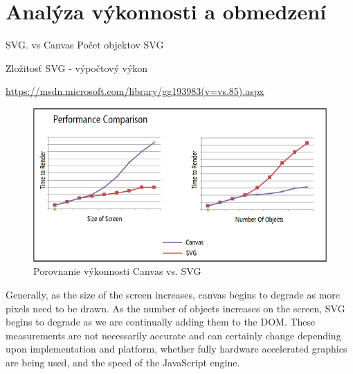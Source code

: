 \chapter{Analýza výkonnosti a obmedzení }

SVG. vs Canvas 
Počet objektov SVG 

Zložitosť SVG - výpočtový výkon

\url{https://msdn.microsoft.com/library/gg193983(v=vs.85).aspx}

 \begin{figure}[H]
\centering
\includegraphics[width=0.7\linewidth]{obrazky/porovnanie}
\caption{Porovnanie výkonnosti Canvas vs. SVG}
\label{fig:podpora}
\end{figure}

Generally, as the size of the screen increases, canvas begins to degrade as more pixels need to be drawn. As the number of objects increases on the screen, SVG begins to degrade as we are continually adding them to the DOM. These measurements are not necessarily accurate and can certainly change depending upon implementation and platform, whether fully hardware accelerated graphics are being used, and the speed of the JavaScript engine.


















